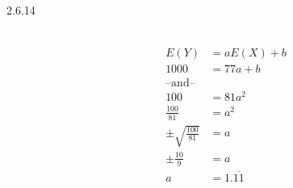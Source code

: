 \documentclass[letterpaper,10pt]{article}
\begin{document}
\begin{description}
\item[2.6.14] \
\begin{align*}
E(Y) &= aE(X)+b \\
1000 &= 77a+b \\
\mbox{--and--} \\
100 &= 81a^{2} \\
\frac{100}{81} &= a^{2} \\
\pm \sqrt{\frac{100}{81}} &= a \\
\pm \frac{10}{9} &= a \\
a &= 1.\overline{11}
\end{align*}

\end {description}
\end{document}
